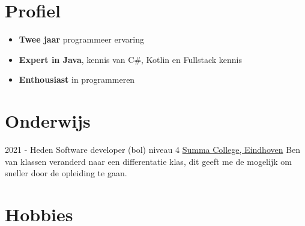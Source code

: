 \documentclass[letterpaper]{twentysecondcv} %
\begin{document}
    \makesidebarFirst %



    \section{Profiel}

    \begin{itemize}
        \item \textbf{Twee jaar} programmeer ervaring
        \item \textbf{Expert in Java}, kennis van C\#, Kotlin en Fullstack kennis
        \item \textbf{Enthousiast} in programmeren
    \end{itemize}

    \vspace{6mm}




    \section{Onderwijs}

    \begin{twenty} %
        \twentyitem
        {2021 -}
        {Heden}
        {Software developer (bol) niveau 4}
        {\href{https://www.summacollege.nl/}{Summa College, Eindhoven}}
        {}
        {
            Ben van klassen veranderd naar een differentatie klas, dit geeft me de mogelijk om sneller door de opleiding te gaan.
        }
    \end{twenty}



    \section{Hobbies}
\end{document}
